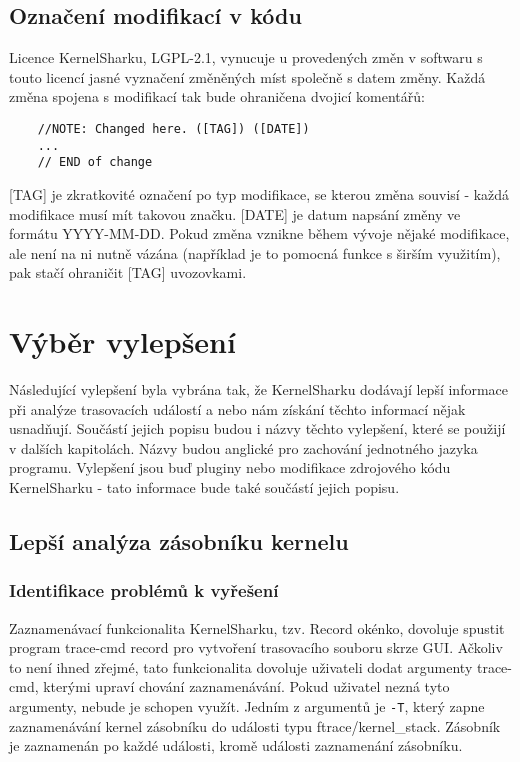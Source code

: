 \subsection{Označení modifikací v kódu}
Licence KernelSharku, LGPL-2.1, vynucuje u provedených změn v softwaru s touto licencí jasné vyznačení změněných míst společně s datem změny. Každá změna spojena s modifikací tak bude ohraničena dvojicí komentářů:
\begin{verbatim}
    //NOTE: Changed here. ([TAG]) ([DATE])
    ...
    // END of change
\end{verbatim}
[TAG] je zkratkovité označení po typ modifikace, se kterou změna souvisí - každá modifikace musí mít takovou značku. [DATE] je datum napsání změny ve formátu YYYY-MM-DD. Pokud změna vznikne během vývoje nějaké modifikace, ale není na ni nutně vázána (například je to pomocná funkce s širším využitím), pak stačí ohraničit [TAG] uvozovkami.

\section{Výběr vylepšení}
Následující vylepšení byla vybrána tak, že KernelSharku dodávají lepší informace při analýze trasovacích událostí a nebo nám získání těchto informací nějak usnadňují. Součástí jejich popisu budou i názvy těchto vylepšení, které se použijí v dalších kapitolách. Názvy budou anglické pro zachování jednotného jazyka programu. Vylepšení jsou buď pluginy nebo modifikace zdrojového kódu KernelSharku - tato informace bude také součástí jejich popisu.

\subsection{Lepší analýza zásobníku kernelu}

\subsubsection*{Identifikace problémů k vyřešení}
Zaznamenávací funkcionalita KernelSharku, tzv. Record okénko, dovoluje spustit program trace-cmd record pro vytvoření trasovacího souboru skrze GUI. Ačkoliv to není ihned zřejmé, tato funkcionalita dovoluje uživateli dodat argumenty trace-cmd, kterými upraví chování zaznamenávání. Pokud uživatel nezná tyto argumenty, nebude je schopen využít. Jedním z argumentů je \verb|-T|, který zapne zaznamenávání kernel zásobníku do události typu ftrace/kernel\_stack. Zásobník je zaznamenán po každé události, kromě události zaznamenání zásobníku.

